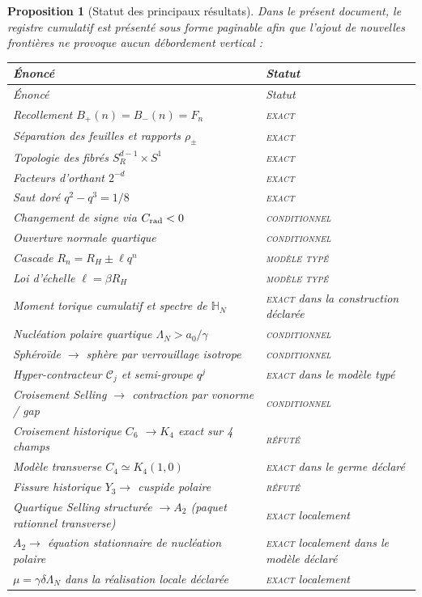 \documentclass[11pt,a4paper]{article}
\newtheorem{proposition}[theorem]{Proposition}
\newcommand{\statusExact}{\textsc{exact}}
\newcommand{\statusCond}{\textsc{conditionnel}}
\newcommand{\statusTyped}{\textsc{modèle typé}}
\begin{document}
\begin{proposition}[Statut des principaux résultats]
Dans le présent document, le registre cumulatif est présenté sous forme paginable afin que l'ajout de nouvelles frontières ne provoque aucun débordement vertical :
\begin{longtable}{@{}p{}p{}@{}}
\toprule
Énoncé & Statut\\
\midrule
\endfirsthead
\toprule
Énoncé & Statut\\
\midrule
\endhead
Recollement $B_+(n)=B_-(n)=F_n$ & \statusExact\\
Séparation des feuilles et rapports $\rho_\pm$ & \statusExact\\
Topologie des fibrés $S_R^{d-1}\times S^1$ & \statusExact\\
Facteurs d'orthant $2^{-d}$ & \statusExact\\
Saut doré $q^2-q^3=1/8$ & \statusExact\\
Changement de signe via $C_{\rm rad}<0$ & \statusCond\\
Ouverture normale quartique & \statusCond\\
Cascade $R_n=R_H\pm\ell q^n$ & \statusTyped\\
Loi d'échelle $\ell=\beta R_H$ & \statusTyped\\
Moment torique cumulatif et spectre de $\mathbb H_N$ & \statusExact{} dans la construction déclarée\\
Nucléation polaire quartique $\Lambda_N>a_0/\gamma$ & \statusCond\\
Sphéroïde $\to$ sphère par verrouillage isotrope & \statusCond\\
Hyper-contracteur $\mathcal C_j$ et semi-groupe $q^j$ & \statusExact{} dans le modèle typé\\
Croisement Selling $\to$ contraction par vonorme / gap & \statusCond\\
Croisement historique $C_6$ $\to K_4$ exact sur 4 champs & \textsc{réfuté}\\
Modèle transverse $C_4\simeq K_4(1,0)$ & \statusExact{} dans le germe déclaré\\
Fissure historique $Y_3\to$ cuspide polaire & \textsc{réfuté}\\
Quartique Selling structurée $\to A_2$ (paquet rationnel transverse) & \statusExact{} localement\\
$A_2\to$ équation stationnaire de nucléation polaire & \statusExact{} localement dans le modèle déclaré\\
$\mu=\gamma\delta\Lambda_N$ dans la réalisation locale déclarée & \statusExact{} localement\\

\end{longtable}
\end{proposition}
\end{document}
